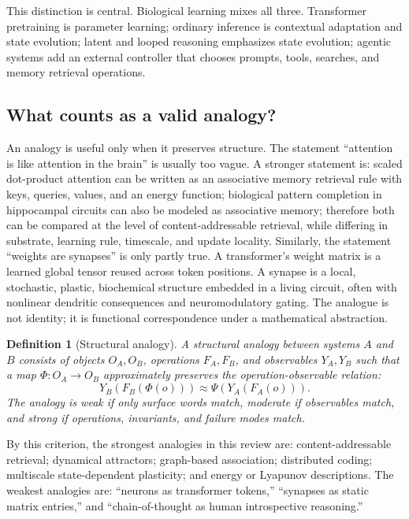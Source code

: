 \documentclass[11pt]{article}
\newtheorem{definition}{Definition}[section]
\newcommand{\1}{\mathbf{1}}
\begin{document}
This distinction is central. Biological learning mixes all three. Transformer pretraining is parameter learning; ordinary inference is contextual adaptation and state evolution; latent and looped reasoning emphasizes state evolution; agentic systems add an external controller that chooses prompts, tools, searches, and memory retrieval operations.

\subsection{What counts as a valid analogy?}

An analogy is useful only when it preserves structure. The statement ``attention is like attention in the brain'' is usually too vague. A stronger statement is: scaled dot-product attention can be written as an associative memory retrieval rule with keys, queries, values, and an energy function; biological pattern completion in hippocampal circuits can also be modeled as associative memory; therefore both can be compared at the level of content-addressable retrieval, while differing in substrate, learning rule, timescale, and update locality. Similarly, the statement ``weights are synapses'' is only partly true. A transformer's weight matrix is a learned global tensor reused across token positions. A synapse is a local, stochastic, plastic, biochemical structure embedded in a living circuit, often with nonlinear dendritic consequences and neuromodulatory gating. The analogue is not identity; it is functional correspondence under a mathematical abstraction.

\begin{definition}[Structural analogy]
A structural analogy between systems $A$ and $B$ consists of objects $O_A,O_B$, operations $F_A,F_B$, and observables $Y_A,Y_B$ such that a map $\Phi:O_A\to O_B$ approximately preserves the operation-observable relation:
\[
Y_B(F_B(\Phi(o))) \approx \Psi(Y_A(F_A(o))).
\]
The analogy is weak if only surface words match, moderate if observables match, and strong if operations, invariants, and failure modes match.
\end{definition}

By this criterion, the strongest analogies in this review are: content-addressable retrieval; dynamical attractors; graph-based association; distributed coding; multiscale state-dependent plasticity; and energy or Lyapunov descriptions. The weakest analogies are: ``neurons as transformer tokens,'' ``synapses as static matrix entries,'' and ``chain-of-thought as human introspective reasoning.''
\end{document}
